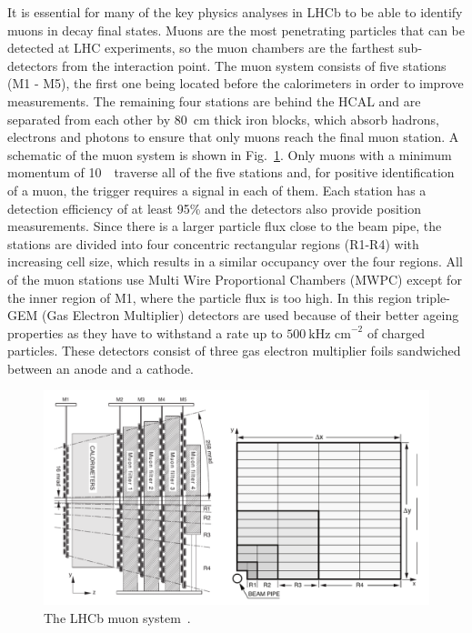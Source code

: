 It is essential for many of the key physics analyses in LHCb to be able to identify muons in decay final states.
Muons are the most penetrating particles that can be detected at LHC experiments, so the muon chambers
are the farthest sub-detectors from the interaction point. The muon system consists of five stations (M1 - M5),
the first one being located before the calorimeters in order to improve \pt measurements. The remaining four stations
are behind the HCAL and are separated from each other by 80~cm thick iron blocks, which absorb
hadrons, electrons and photons to ensure that only muons reach the final muon station. 
A schematic of the muon system is shown in Fig.~\ref{fig:muonsystem}.
Only muons with a minimum momentum of 10~\gevc~traverse all of the
five stations and, for positive identification of a muon, the trigger requires a signal in each of them.
Each station has a detection efficiency of at least 95\% and the detectors also provide position measurements.
Since there is a larger particle flux close to the beam pipe, the stations are divided
into four concentric rectangular regions (R1-R4) with increasing cell size, which %
results in a similar occupancy over the four regions. All of the muon stations use
Multi Wire Proportional Chambers (MWPC) except for the inner region of M1, where the particle flux is too high.
In this region triple-GEM (Gas Electron Multiplier) detectors are used because of their better ageing properties
as they have to withstand a rate up to $500 ~\mbox{kHz cm}^{-2}$ of charged particles. 
These detectors consist of three gas electron multiplier foils sandwiched between an anode and a cathode.
%
\begin{figure}[h!]
\centering \includegraphics[width=1.0\textwidth]{Detector/figs/muon.png}
\caption{The LHCb muon system~\cite{Alves:2008zz}.}
\label{fig:muonsystem}
\end{figure}

